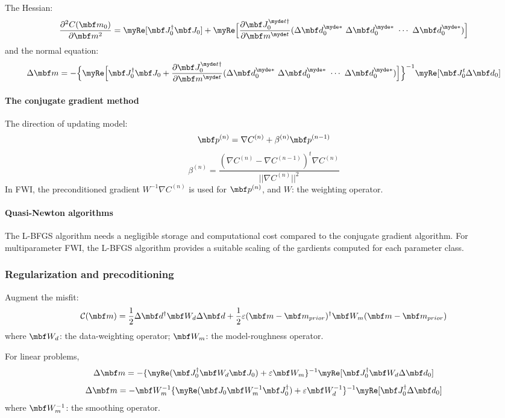 The Hessian:
\[ \frac{\partial^2 C(\mbf m_0)}{\partial\mbf m^2}=\myRe[\mbf J_0^\dagger\mbf J_0]
  +\myRe\Big[\frac{\partial\mbf J_0^{\myde t\dagger}}{\partial\mbf m^{\myde t}}
  (\Delta\mbf d_0^{\myde *}~\Delta\mbf d_0^{\myde *}~\cdots~\Delta\mbf d_0^{\myde *})\Big] \]
and the normal equation:
\[ \Delta\mbf m=-\Big\{\myRe\Big[\mbf J_0^\dagger\mbf J_0
  +\frac{\partial\mbf J_0^{\myde t\dagger}}{\partial\mbf m^{\myde t}}
  (\Delta\mbf d_0^{\myde *}~\Delta\mbf d_0^{\myde *}~\cdots~\Delta\mbf d_0^{\myde *})
  \Big]\Big\}^{-1}\myRe[\mbf J_0^t\Delta\mbf d_0] \]

\paragraph{The conjugate gradient method}
The direction of updating model:
\[ \mbf p^{(n)}=\nabla C^{(n)}+\beta^{(n)}\mbf p^{(n-1)} \]
\[ \beta^{(n)}=\frac{(\nabla C^{(n)}-\nabla C^{(n-1)})^t\nabla C^{(n)}}{||\nabla C^{(n)}||^2} \]
In FWI, the preconditioned gradient
$W^{-1}\nabla C^{(n)}$ is used for $\mbf p^{(n)}$,
and $W$: the weighting operator.

\paragraph{Quasi-Newton algorithms}
The L-BFGS algorithm needs a negligible storage and computational cost
compared to the conjugate gradient algorithm.
For multiparameter FWI, the L-BFGS algorithm provides a suitable scaling of the gardients
computed for each parameter class.

\subsubsection{Regularization and precoditioning}
Augment the misfit:
\[ \mathcal{C}(\mbf m)=\frac{1}{2}\Delta\mbf d^\dagger\mbf W_d\Delta\mbf d
  +\frac{1}{2}\varepsilon(\mbf m-\mbf m_{prior})^\dagger\mbf W_m(\mbf m-\mbf m_{prior}) \]
where $\mbf W_d$: the data-weighting operator;
$\mbf W_m$: the model-roughness operator.

For linear problems,
\[ \Delta\mbf m=-\{\myRe(\mbf J_0^\dagger\mbf W_d\mbf J_0)+\varepsilon\mbf W_m\}^{-1}
  \myRe[\mbf J_0^\dagger\mbf W_d\Delta\mbf d_0] \]
\[ \Delta\mbf m=-\mbf W_m^{-1}\{\myRe(\mbf J_0\mbf W_m^{-1}\mbf J_0^\dagger)
  +\varepsilon\mbf W_d^{-1}\}^{-1}\myRe[\mbf J_0^\dagger\Delta\mbf d_0] \]
where $\mbf W_m^{-1}$: the smoothing operator.


